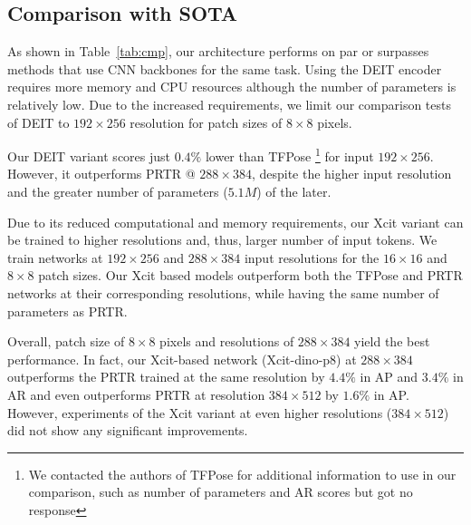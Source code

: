 \documentclass[runningheads]{llncs}
\begin{document}
\subsection{Comparison with SOTA}
As shown in Table~\ref{tab:cmp}, our architecture performs on par or surpasses methods that use CNN backbones for the same task. Using the DEIT encoder requires more memory and CPU resources although the number of parameters is relatively low. Due to the increased requirements, we limit our comparison tests of DEIT to $192 \times 256$ resolution for patch sizes of $8 \times 8$ pixels. 

Our DEIT variant scores just $0.4\%$ lower than TFPose
\footnote{We contacted the authors of TFPose for additional information to use in our comparison, such as number of parameters and AR scores but got no response}
for input $192 \times 256$. 
However, it outperforms PRTR @ $288 \times 384$, despite the higher input resolution and the 
greater number of parameters ($5.1M$) of the later.

Due to its reduced computational and memory requirements, our Xcit variant  can be trained 
to higher resolutions and, thus, larger number of input tokens. We train networks at $192 \times 256$ and $288 \times 384$ input resolutions for the  $16 \times 16$ and $8 \times 8$ patch sizes. Our Xcit based models outperform both the TFPose and PRTR networks at their corresponding resolutions, while having the same number of parameters as PRTR. 

Overall, patch size of $8 \times 8$ pixels and resolutions of $288 \times 384$ yield the best performance. In fact, our Xcit-based network (Xcit-dino-p8) at $288 \times 384$ outperforms the PRTR trained at the same resolution by $4.4\%$ in AP and $3.4\%$ in AR and even outperforms PRTR at resolution $384 \times 512$ by $1.6\%$ in AP. However, experiments of the Xcit variant at even higher resolutions ($384 \times 512$) did not show any significant improvements.
\end{document}
